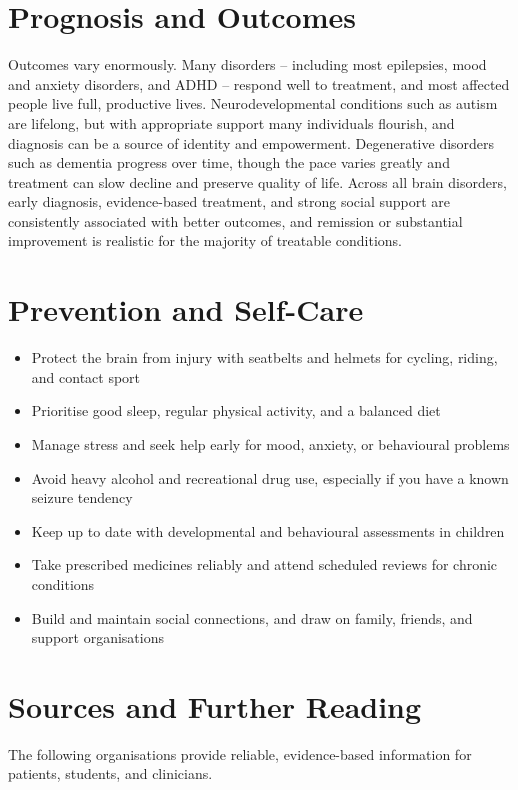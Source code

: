 \section*{Prognosis and Outcomes}
Outcomes vary enormously. Many disorders -- including most epilepsies, mood and anxiety disorders, and ADHD -- respond well to treatment, and most affected people live full, productive lives. Neurodevelopmental conditions such as autism are lifelong, but with appropriate support many individuals flourish, and diagnosis can be a source of identity and empowerment. Degenerative disorders such as dementia progress over time, though the pace varies greatly and treatment can slow decline and preserve quality of life. Across all brain disorders, early diagnosis, evidence-based treatment, and strong social support are consistently associated with better outcomes, and remission or substantial improvement is realistic for the majority of treatable conditions.

\section*{Prevention and Self-Care}
\begin{itemize}
    \item Protect the brain from injury with seatbelts and helmets for cycling, riding, and contact sport
    \item Prioritise good sleep, regular physical activity, and a balanced diet
    \item Manage stress and seek help early for mood, anxiety, or behavioural problems
    \item Avoid heavy alcohol and recreational drug use, especially if you have a known seizure tendency
    \item Keep up to date with developmental and behavioural assessments in children
    \item Take prescribed medicines reliably and attend scheduled reviews for chronic conditions
    \item Build and maintain social connections, and draw on family, friends, and support organisations
\end{itemize}

\section*{Sources and Further Reading}
The following organisations provide reliable, evidence-based information for patients, students, and clinicians.

